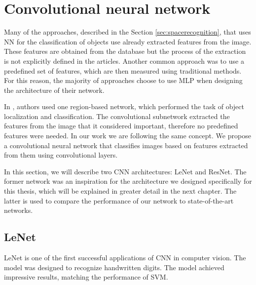 \section{Convolutional neural network}

Many of the approaches, described in the Section \ref{sec:spacerecognition}, that uses NN for the classification of objects use already extracted features from the image. These features are obtained from the database but the process of the extraction is not explicitly defined in the articles. Another common approach was to use a predefined set of features, which are then measured using traditional methods. For this reason, the majority of approaches choose to use MLP when designing the architecture of their network.

In \cite{Burke2019}, authors used one region-based network, which performed the task of object localization and classification. The convolutional subnetwork extracted the features from the image that it considered important, therefore no predefined features were needed. In our work we are following the same concept. We propose a convolutional neural network that classifies images based on features extracted from them using convolutional layers.



In this section, we will describe two CNN architectures: LeNet and ResNet. The former network was an inspiration for the architecture we designed specifically for this thesis, which will be explained in greater detail in the next chapter. The latter is used to compare the performance of our network to state-of-the-art networks. 


\subsection{LeNet}

LeNet \cite{lenet5} is one of the first successful applications of CNN in computer vision. The model was designed to recognize handwritten digits. The model achieved impressive results, matching the performance of SVM.

